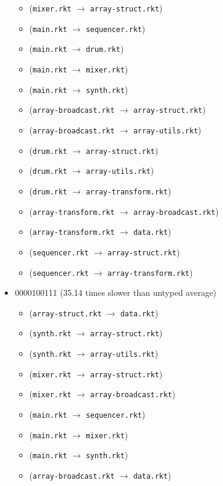 \documentclass{article}
\newcommand{\mono}[1]{\texttt{#1}}
\begin{document}
\begin{itemize}
\begin{itemize}
  \item (\mono{mixer.rkt} $\rightarrow$ \mono{array-struct.rkt})
  \item (\mono{main.rkt} $\rightarrow$ \mono{sequencer.rkt})
  \item (\mono{main.rkt} $\rightarrow$ \mono{drum.rkt})
  \item (\mono{main.rkt} $\rightarrow$ \mono{mixer.rkt})
  \item (\mono{main.rkt} $\rightarrow$ \mono{synth.rkt})
  \item (\mono{array-broadcast.rkt} $\rightarrow$ \mono{array-struct.rkt})
  \item (\mono{array-broadcast.rkt} $\rightarrow$ \mono{array-utils.rkt})
  \item (\mono{drum.rkt} $\rightarrow$ \mono{array-struct.rkt})
  \item (\mono{drum.rkt} $\rightarrow$ \mono{array-utils.rkt})
  \item (\mono{drum.rkt} $\rightarrow$ \mono{array-transform.rkt})
  \item (\mono{array-transform.rkt} $\rightarrow$ \mono{array-broadcast.rkt})
  \item (\mono{array-transform.rkt} $\rightarrow$ \mono{data.rkt})
  \item (\mono{sequencer.rkt} $\rightarrow$ \mono{array-struct.rkt})
  \item (\mono{sequencer.rkt} $\rightarrow$ \mono{array-transform.rkt})
  \end{itemize}
\item 0000100111 (35.14 times slower than untyped average)
  \begin{itemize}
  \item (\mono{array-struct.rkt} $\rightarrow$ \mono{data.rkt})
  \item (\mono{synth.rkt} $\rightarrow$ \mono{array-struct.rkt})
  \item (\mono{synth.rkt} $\rightarrow$ \mono{array-utils.rkt})
  \item (\mono{mixer.rkt} $\rightarrow$ \mono{array-struct.rkt})
  \item (\mono{mixer.rkt} $\rightarrow$ \mono{array-broadcast.rkt})
  \item (\mono{main.rkt} $\rightarrow$ \mono{sequencer.rkt})
  \item (\mono{main.rkt} $\rightarrow$ \mono{mixer.rkt})
  \item (\mono{main.rkt} $\rightarrow$ \mono{synth.rkt})
  \item (\mono{array-broadcast.rkt} $\rightarrow$ \mono{data.rkt})

\end{itemize}
\end{itemize}
\end{document}
